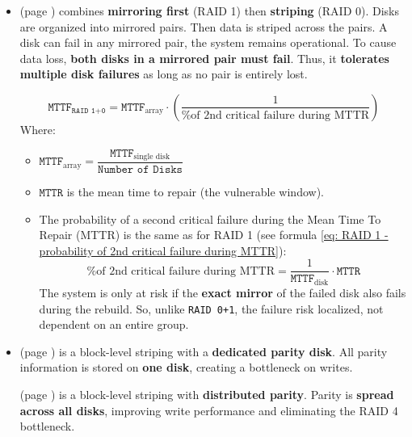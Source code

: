 \begin{itemize}
\begin{itemize}
        
        \item {} (page ) combines \textbf{mirroring first} (RAID 1) then \textbf{striping} (RAID 0). Disks are organized into mirrored pairs. Then data is striped across the pairs. A disk can fail in any mirrored pair, the system remains operational. To cause data loss, \textbf{both disks in a mirrored pair must fail}. Thus, it \textbf{tolerates multiple disk failures} as long as no pair is entirely lost.
        
        \begin{equation}
            \texttt{MTTF}_{\texttt{RAID 1+0}} = \texttt{MTTF}_{\text{array}} \cdot \left(
                \dfrac{1}{\text{\% of 2nd critical failure during MTTR}}
            \right)
        \end{equation}
        Where:
        \begin{itemize}
            \item $\texttt{MTTF}_{\text{array}} = \dfrac{\texttt{MTTF}_{\text{single disk}}}{\texttt{Number of Disks}}$
            \item $\texttt{MTTR}$ is the mean time to repair (the vulnerable window).
            \item The probability of a second critical failure during the Mean Time To Repair (MTTR) is the same as for RAID 1 (see formula \ref{eq: RAID 1 - probability of 2nd critical failure during MTTR}):
            \begin{equation}
                \text{\% of 2nd critical failure during MTTR} = \dfrac{1}{\texttt{MTTF}_{\text{disk}}} \cdot \texttt{MTTR}
            \end{equation}
            The system is only at risk if the \textbf{exact mirror} of the failed disk also fails during the rebuild. So, unlike \texttt{RAID 0+1}, the failure risk localized, not dependent on an entire group.
        \end{itemize}


        \item {} (page ) is a block-level striping with a \textbf{dedicated parity disk}. All parity information is stored on \textbf{one disk}, creating a bottleneck on writes.
        
         (page ) is a block-level striping with \textbf{distributed parity}. Parity is \textbf{spread across all disks}, improving write performance and eliminating the RAID 4 bottleneck.


\end{itemize}
\end{itemize}
